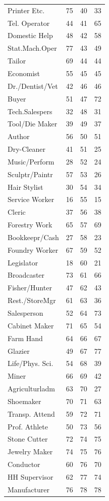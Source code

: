 \begin{tabular}{lccc}
Printer Etc.&75&40&33\\
Tel. Operator&44&41&65\\
Domestic Help&48&42&58\\
Stat.Mach.Oper&77&43&49\\
Tailor&69&44&44\\
Economist&55&45&45\\
Dr./Dentist/Vet&42&46&46\\
Buyer&51&47&72\\
Tech.Salespers&32&48&31\\
Tool/Die Maker&39&49&37\\
Author&56&50&51\\
Dry-Cleaner&41&51&25\\
Music/Perform&28&52&24\\
Sculptr/Paintr&57&53&26\\
Hair Stylist&30&54&34\\
Service Worker&16&55&15\\
Cleric&37&56&38\\
Forestry Work&65&57&69\\
Bookkeepr/Cash&27&58&23\\
Foundry Worker&67&59&52\\
Legislator&18&60&21\\
Broadcaster&73&61&66\\
Fisher/Hunter&47&62&43\\
Rest./StoreMgr&61&63&36\\
Salesperson&52&64&73\\
Cabinet Maker&71&65&54\\
Farm Hand&64&66&67\\
Glazier&49&67&77\\
Life/Phys. Sci.&54&68&39\\
Miner&66&69&42\\
Agriculturladm&63&70&27\\
Shoemaker&70&71&63\\
Transp. Attend&59&72&71\\
Prof. Athlete&50&73&56\\
Stone Cutter&72&74&75\\
Jewelry Maker&74&75&76\\
Conductor&60&76&70\\
HH Supervisor&62&77&74\\
Manufacturer&76&78&78\\
\hline\hline
\end{tabular}
